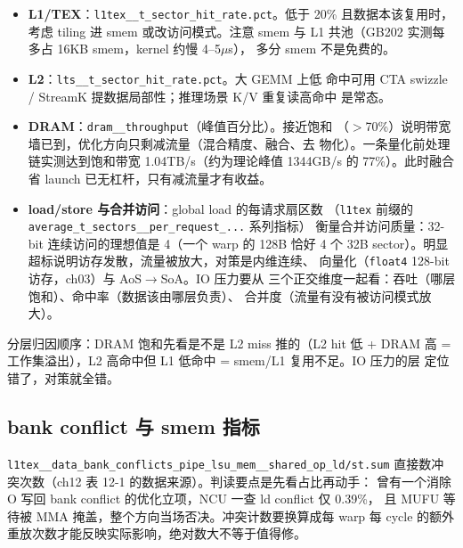 \begin{itemize}
\item \textbf{L1/TEX}：\texttt{l1tex\_\allowbreak{}\_\allowbreak{}t\_\allowbreak{}sector\_\allowbreak{}hit\_\allowbreak{}rate.pct}。低于
  20\% 且数据本该复用时，考虑 tiling 进 smem 或改访问模式。注意 smem 与 L1
  共池（GB202 实测每多占 16KB smem，kernel 约慢 4--5$\mu$s），
  多分 smem 不是免费的。
\item \textbf{L2}：\texttt{lts\_\allowbreak{}\_\allowbreak{}t\_\allowbreak{}sector\_\allowbreak{}hit\_\allowbreak{}rate.\allowbreak{}pct}。大 GEMM 上低
  命中可用 CTA swizzle / StreamK 提数据局部性；推理场景 K/V 重复读高命中
  是常态。
\item \textbf{DRAM}：\texttt{dram\_\allowbreak{}\_\allowbreak{}throughput}（峰值百分比）。接近饱和
  （$>$70\%）说明带宽墙已到，优化方向只剩减流量（混合精度、融合、去
  物化）。一条量化前处理链实测达到饱和带宽 1.04TB/s（约为理论峰值
  1344GB/s 的 77\%）。此时融合省 launch 已无杠杆，只有减流量才有收益。
\item \textbf{load/store 与合并访问}：global load 的每请求扇区数
  （\texttt{l1tex} 前缀的
  \texttt{average\_\allowbreak{}t\_\allowbreak{}sectors\_\allowbreak{}\_\allowbreak{}per\_\allowbreak{}request\_\allowbreak{}\allowbreak{}...} 系列指标）
  衡量合并访问质量：32-bit 连续访问的理想值是 4（一个 warp 的 128B 恰好
  4 个 32B sector）。明显超标说明访存发散，流量被放大，对策是内维连续、
  向量化（\texttt{float4} 128-bit 访存，ch03）与 AoS$\to$SoA。IO 压力要从
  三个正交维度一起看：吞吐（哪层饱和）、命中率（数据该由哪层负责）、
  合并度（流量有没有被访问模式放大）。
\end{itemize}

分层归因顺序：DRAM 饱和先看是不是 L2 miss 推的（L2 hit 低 + DRAM 高 =
工作集溢出），L2 高命中但 L1 低命中 = smem/L1 复用不足。IO 压力的层
定位错了，对策就全错。

\subsection{bank conflict 与 smem 指标}

\texttt{l1tex\_\allowbreak{}\_\allowbreak{}data\_\allowbreak{}bank\_\allowbreak{}conflicts\_\allowbreak{}pipe\_\allowbreak{}lsu\_\allowbreak{}mem\_\allowbreak{}\_\allowbreak{}shared\_\allowbreak{}op\_\allowbreak{}ld/\allowbreak{}st.sum}
直接数冲突次数（ch12 表 12-1 的数据来源）。判读要点是先看占比再动手：
曾有一个消除 O 写回 bank conflict 的优化立项，NCU 一查 ld conflict 仅 0.39\%，
且 MUFU 等待被 MMA 掩盖，整个方向当场否决。冲突计数要换算成每 warp 每 cycle
的额外重放次数才能反映实际影响，绝对数大不等于值得修。

